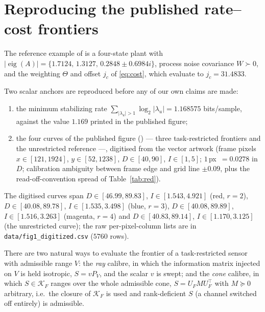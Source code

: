 
\section{Reproducing the published rate--cost frontiers}
\label{sec:repro}

The reference example of \cite{refpaper} is a four-state plant with
$|\operatorname{eig}(A)|=\{1.7124,\,1.3127,\,0.2848\pm0.6984i\}$, process noise
covariance $W\succ0$, and the weighting $\Theta$ and offset $j_c$ of
\eqref{eq:cost}, which evaluate to $j_c=31.4833$.

Two scalar anchors are reproduced before any of our own claims are made:

\begin{enumerate}
 \item the minimum stabilizing rate $\sum_{|\lambda_u|>1}\log_2|\lambda_u|
 = 1.168575$ bits/sample, against the value $1.169$ printed in the
 published figure;
 \item the four curves of the published figure (\cite[Fig.~1]{refpaper}) ---
 three task-restricted frontiers and the
 unrestricted reference ---, digitised from the
 vector artwork (frame pixels $x\in[121,1924]$, $y\in[52,1238]$,
 $D\in[40,90]$, $I\in[1,5]$; $1$\,px~$=0.0278$ in $D$; calibration
 ambiguity between frame edge and grid line $\pm0.09$, plus the
 read-off-convention spread of Table~\ref{tab:red}).
\end{enumerate}

The digitised curves span $D\in[46.99,89.83]$, $I\in[1.543,4.921]$ (red,
$r=2$), $D\in[40.08,89.78]$, $I\in[1.535,3.498]$ (blue, $r=3$),
$D\in[40.08,89.89]$, $I\in[1.516,3.263]$ (magenta, $r=4$) and
$D\in[40.83,89.14]$, $I\in[1.170,3.125]$ (the unrestricted curve); the raw
per-pixel-column lists are in \texttt{data/fig1\_digitized.csv} ($5760$ rows).

\begin{remark}[calibre]
\label{rmk:calibre}
There are two natural ways to evaluate the frontier of a task-restricted sensor
with admissible range $V$: the \emph{ray} calibre, in which the information
matrix injected on $V$ is held isotropic, $S=vP_V$, and the scalar $v$ is
swept; and the \emph{cone} calibre,
in which $S\in\mathcal K_F$ ranges over the whole admissible cone,
$S=U_F M U_F^{\top}$ with $M\succeq0$ arbitrary, i.e.\ the closure of
$\mathcal K_F$ is used and rank-deficient $S$ (a channel switched off entirely)
is admissible. 
\end{remark}


